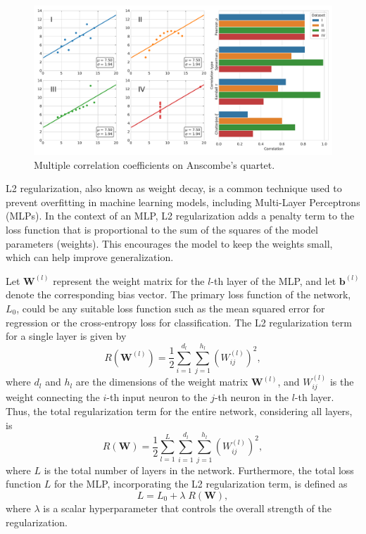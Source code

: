 \begin{figure}[!ht]
\centering
\caption{Multiple correlation coefficients on Anscombe's quartet.}
    \includegraphics[width=1\linewidth]{images/anscombe_quartet.pdf}
\end{figure}



L2 regularization, also known as weight decay, is a common technique used to prevent overfitting in machine learning models, including Multi-Layer Perceptrons (MLPs). In the context of an MLP, L2 regularization adds a penalty term to the loss function that is proportional to the sum of the squares of the model parameters (weights). This encourages the model to keep the weights small, which can help improve generalization.

Let $\mathbf{W}^{(l)}$ represent the weight matrix for the $l$-th layer of the MLP, and let $\mathbf{b}^{(l)}$ denote the corresponding bias vector. The primary loss function of the network, $L_0$, could be any suitable loss function such as the mean squared error for regression or the cross-entropy loss for classification. The L2 regularization term for a single layer is given by
\begin{equation}
R(\mathbf{W}^{(l)}) = \frac{1}{2} \sum_{i=1}^{d_l} \sum_{j=1}^{h_l} \left( W^{(l)}_{ij} \right)^2,
\end{equation}
where $d_l$ and $h_l$ are the dimensions of the weight matrix $\mathbf{W}^{(l)}$, and $W^{(l)}_{ij}$ is the weight connecting the $i$-th input neuron to the $j$-th neuron in the $l$-th layer. Thus, the total regularization term for the entire network, considering all layers, is
\begin{equation}
R(\mathbf{W}) = \frac{1}{2} \sum_{l=1}^{L} \sum_{i=1}^{d_l} \sum_{j=1}^{h_l} \left( W^{(l)}_{ij} \right)^2,
\end{equation}
where $L$ is the total number of layers in the network. Furthermore, the total loss function $L$ for the MLP, incorporating the L2 regularization term, is defined as
\begin{equation}
L = L_0 + \lambda \; R(\mathbf{W}),
\end{equation}
where $\lambda$ is a scalar hyperparameter that controls the overall strength of the regularization.

